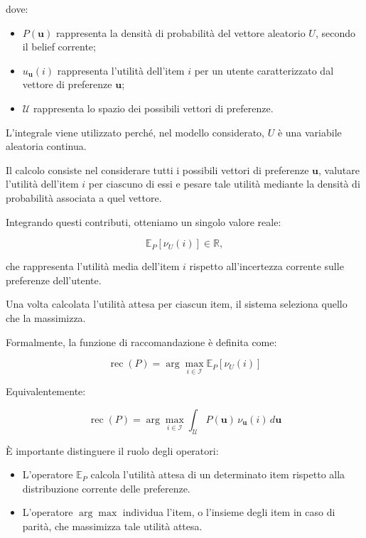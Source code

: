dove:
\begin{itemize}
    \item $P(\mathbf u)$ rappresenta la densità di probabilità
    del vettore aleatorio $U$, secondo il belief corrente;

    \item $u_{\mathbf u}(i)$ rappresenta l'utilità dell'item $i$
    per un utente caratterizzato dal vettore di preferenze
    $\mathbf u$;

    \item $\mathcal U$ rappresenta lo spazio dei possibili
    vettori di preferenze.
\end{itemize}

L'integrale viene utilizzato perché, nel modello considerato,
$U$ è una variabile aleatoria continua.

Il calcolo consiste nel considerare tutti i possibili vettori
di preferenze $\mathbf u$, valutare l'utilità dell'item $i$
per ciascuno di essi e pesare tale utilità mediante la
densità di probabilità associata a quel vettore.

Integrando questi contributi, otteniamo un singolo valore reale:

\[
\mathbb E_P[\nu_U(i)]\in\mathbb R,
\]

che rappresenta l'utilità media dell'item $i$ rispetto
all'incertezza corrente sulle preferenze dell'utente.

Una volta calcolata l'utilità attesa per ciascun item,
il sistema seleziona quello che la massimizza.

Formalmente, la funzione di raccomandazione è definita come:

\[
\boxed{
\operatorname{rec}(P)
=
\arg\max_{i\in\mathcal I}
\mathbb E_P[\nu_U(i)]
}
\]

Equivalentemente:

\[
\boxed{
\operatorname{rec}(P)
=
\arg\max_{i\in\mathcal I}
\int_{\mathcal U}
P(\mathbf u)\,\nu_{\mathbf u}(i)\,d\mathbf u
}
\]

È importante distinguere il ruolo degli operatori:

\begin{itemize}
    \item L'operatore $\mathbb E_P$ calcola l'utilità attesa
    di un determinato item rispetto alla distribuzione
    corrente delle preferenze.

    \item L'operatore $\arg\max$ individua l'item, o l'insieme
    degli item in caso di parità, che massimizza tale utilità attesa.
\end{itemize}

